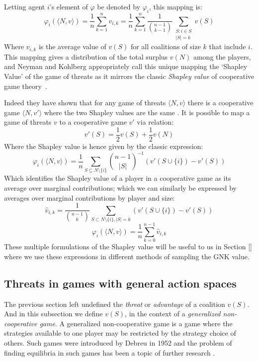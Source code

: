 Letting agent $i$'s element of $\varphi$ be denoted by $\varphi_i$, this mapping is:
\begin{equation}\label{da_value_eq} 
\varphi_i(\langle N,v\rangle)
= \frac{1}{n}\sum_{k=1}^n v_{i,k} 
= \frac{1}{n}\sum_{k=1}^n \frac{1}{\binom{n-1}{k-1}} \sum_{\substack{S:i\in S \\ |S|=k}}v(S) 
\end{equation}
Where $v_{i,k}$ is the average value of $v(S)$ for all coalitions of size $k$ that include $i$.
This mapping gives a distribution of the total surplus $v(N)$ among the players, and Neyman and Kohlberg appropriately call this unique mapping the `Shapley Value' of the game of threats \cite{KOHLBERG2018139} as it mirrors the classic \textit{Shapley value} of cooperative game theory~\cite{Shapley1953a}.

Indeed they have shown that for any game of threats $\langle N,v\rangle$ there is a cooperative game $\langle N,v'\rangle$ where the two Shapley values are the same \cite{KOHLBERG2018139}.
It is possible to map a game of threats $v$ to a cooperative game $v'$ via relation:
\begin{equation}\label{convert1}
v'(S)=\frac{1}{2}v(S)+\frac{1}{2}v(N)
\end{equation}
Where the Shapley value is hence given by the classic expression:
\begin{equation}\label{eq:shapley_value}
    \varphi_i(\langle N,v\rangle)= \frac{1}{n}\sum_{S\subseteq N\setminus\{i\}} \binom{n-1}{|S|}^{-1} \left(v'(S\cup\{i\})-v'(S)\right) 
\end{equation}
Which identifies the Shapley value of a player in a cooperative game as its average over marginal contributions; which we can similarly be expressed by averages over marginal contributions by player and size:
\begin{equation}\label{eq:shapley_value2}
\hat{v}_{i,k} = \frac{1}{\binom{n-1}{k}}\sum_{S\subset N\setminus \{ i\} , |S|=k} %
(v'(S\cup\{i\})-v'(S))
\end{equation}
\begin{equation}\label{shap2} \varphi_i(\langle N,v\rangle) = \frac{1}{n}\sum_{k=0}^{n-1}\hat{v}_{i,k} \end{equation}
These multiple formulations of the Shapley value will be useful to us in Section \ref{} where we use these expressions in different methods of sampling the GNK value.


\subsection{Threats in games with general action spaces}\label{the_value_def3}
The previous section left undefined the \emph{threat} or \emph{advantage} of a coalition $v(S)$.
And in this subsection we define $v(S)$, in the context of a \textit{generalized non-cooperative game}.
A generalized non-cooperative game is a game where the strategies available to one player may be restricted by the strategy choice of others.
Such games were introduced by Debreu in 1952 \cite{Debreu01101952} and the problem of finding equilibria in such games has been a topic of further research \cite{Facchinei2007,fischer2014,DutangSurvey}.

